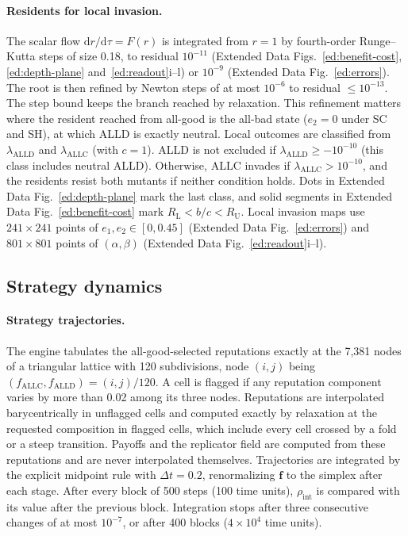\documentclass[10pt]{wlscirep}
\newcommand{\dd}{\mathrm{d}}
\newcommand{\ALLC}{\mathrm{ALLC}}
\newcommand{\ALLD}{\mathrm{ALLD}}
\theoremstyle{plain}
\theoremstyle{remark}
\begin{document}
\paragraph{Residents for local invasion.} The scalar flow $\dd r/\dd\tau=F(r)$ is integrated from $r=1$ by fourth-order Runge--Kutta steps of size 0.18, to residual $10^{-11}$ (Extended Data Figs.~\ref{ed:benefit-cost}, \ref{ed:depth-plane} and~\ref{ed:readout}i--l) or $10^{-9}$ (Extended Data Fig.~\ref{ed:errors}). The root is then refined by Newton steps of at most $10^{-6}$ to residual $\leq10^{-13}$. The step bound keeps the branch reached by relaxation. This refinement matters where the resident reached from all-good is the all-bad state ($e_2=0$ under SC and SH), at which ALLD is exactly neutral. Local outcomes are classified from $\lambda_{\ALLD}$ and $\lambda_{\ALLC}$ (with $c=1$). ALLD is not excluded if $\lambda_{\ALLD}\geq-10^{-10}$ (this class includes neutral ALLD). Otherwise, ALLC invades if $\lambda_{\ALLC}>10^{-10}$, and the residents resist both mutants if neither condition holds. Dots in Extended Data Fig.~\ref{ed:depth-plane} mark the last class, and solid segments in Extended Data Fig.~\ref{ed:benefit-cost} mark $R_{\mathrm L}<b/c<R_{\mathrm U}$. Local invasion maps use $241\times241$ points of $e_1,e_2\in[0,0.45]$ (Extended Data Fig.~\ref{ed:errors}) and $801\times801$ points of $(\alpha,\beta)$ (Extended Data Fig.~\ref{ed:readout}i--l).

\subsection{Strategy dynamics}

\paragraph{Strategy trajectories.} The engine tabulates the all-good-selected reputations exactly at the 7,381 nodes of a triangular lattice with 120 subdivisions, node $(i,j)$ being $(f_{\ALLC},f_{\ALLD})=(i,j)/120$. A cell is flagged if any reputation component varies by more than 0.02 among its three nodes. Reputations are interpolated barycentrically in unflagged cells and computed exactly by relaxation at the requested composition in flagged cells, which include every cell crossed by a fold or a steep transition. Payoffs and the replicator field are computed from these reputations and are never interpolated themselves. Trajectories are integrated by the explicit midpoint rule with $\Delta t=0.2$, renormalizing $\bm f$ to the simplex after each stage. After every block of 500 steps (100 time units), $\rho_{\mathrm{int}}$ is compared with its value after the previous block. Integration stops after three consecutive changes of at most $10^{-7}$, or after 400 blocks ($4\times10^4$ time units).
\end{document}
